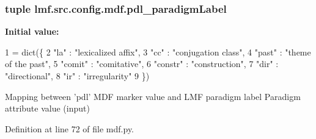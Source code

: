 \hypertarget{namespacelmf_1_1src_1_1config_1_1mdf_a8e61adc475ca415a33c85ef16c96d03d}{
\subsubsection[{pdl\+\_\+paradigm\+Label}]{\setlength{\rightskip}{0pt plus 5cm}tuple lmf.\+src.\+config.\+mdf.\+pdl\+\_\+paradigm\+Label}}\label{namespacelmf_1_1src_1_1config_1_1mdf_a8e61adc475ca415a33c85ef16c96d03d}
{\bfseries Initial value\+:}
\begin{DoxyCode}
1 = dict(\{
2     \textcolor{stringliteral}{"la"}        : \textcolor{stringliteral}{"lexicalized affix"},
3     \textcolor{stringliteral}{"cc"}        : \textcolor{stringliteral}{"conjugation class"},
4     \textcolor{stringliteral}{"past"}      : \textcolor{stringliteral}{"theme of the past"},
5     \textcolor{stringliteral}{"comit"}     : \textcolor{stringliteral}{"comitative"},
6     \textcolor{stringliteral}{"constr"}    : \textcolor{stringliteral}{"construction"},
7     \textcolor{stringliteral}{"dir"}       : \textcolor{stringliteral}{"directional"},
8     \textcolor{stringliteral}{"ir"}        : \textcolor{stringliteral}{"irregularity"}
9 \})
\end{DoxyCode}


Mapping between 'pdl' M\+D\+F marker value and L\+M\+F paradigm label Paradigm attribute value (input) 



Definition at line 72 of file mdf.\+py.

